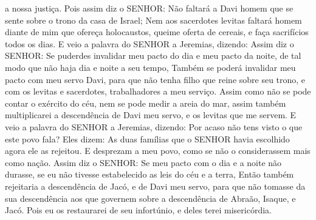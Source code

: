 {{} a nossa justiça.
Pois assim diz o SENHOR: Não faltará a Davi homem que se sente sobre o trono da casa de Israel;
Nem aos sacerdotes levitas faltará homem diante de mim que ofereça holocaustos, queime oferta de cereais, e faça sacrifícios todos os dias.
E veio a palavra do SENHOR a Jeremias, dizendo:
Assim diz o SENHOR: Se puderdes invalidar meu pacto do dia e meu pacto da noite, de tal modo que não haja dia e noite a seu tempo,
Também se poderá invalidar meu pacto com meu servo Davi, para que não tenha filho que reine sobre seu trono, e com os levitas e sacerdotes, trabalhadores a meu serviço.
Assim como não se pode contar o exército do céu, nem se pode medir a areia do mar, assim também multiplicarei a descendência
 de Davi meu servo, e os levitas que me servem.
E veio a palavra do SENHOR a Jeremias, dizendo:
Por acaso não tens visto o que este povo fala? Eles dizem: As duas famílias
 que o SENHOR havia escolhido agora ele as rejeitou. E desprezam a meu povo, como se não o considerassem mais como nação.
Assim diz o SENHOR: Se meu pacto com o dia e a noite não durasse, se eu não tivesse estabelecido as leis do céu e a terra,
Então também rejeitaria a descendência
 de Jacó, e de Davi meu servo, para que não tomasse da sua descendência aos que governem sobre a descendência de Abraão, Isaque, e Jacó. Pois eu os restaurarei de seu infortúnio, e deles terei misericórdia.

\par }

